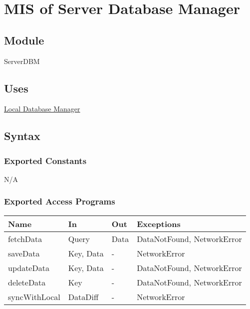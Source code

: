 \documentclass[12pt, titlepage]{article}
\begin{document}
\newpage

\section{MIS of Server Database Manager} \label{server-dbm}

\subsection{Module}

ServerDBM

\subsection{Uses}

\hyperref[local-dbm]{Local Database Manager}

\subsection{Syntax}

\subsubsection{Exported Constants}

N/A

\subsubsection{Exported Access Programs}

\begin{center}
  \begin{tabular}{p{4cm} p{4cm} p{3cm} p{3cm}}
    \hline
    \textbf{Name} & \textbf{In} & \textbf{Out} & \textbf{Exceptions}        \\
    \hline
    fetchData     & Query       & Data         & DataNotFound, NetworkError \\
    saveData      & Key, Data   & -            & NetworkError               \\
    updateData    & Key, Data   & -            & DataNotFound, NetworkError \\
    deleteData    & Key         & -            & DataNotFound, NetworkError \\
    syncWithLocal & DataDiff    & -            & NetworkError               \\
    \hline
  \end{tabular}
\end{center}
\end{document}

